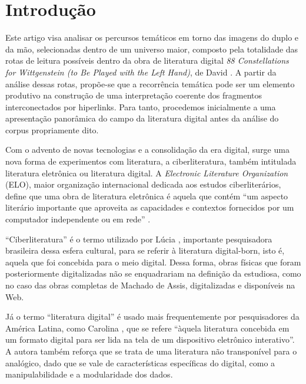 \documentclass[portuguese]{textolivre}
\begin{document}
\begin{polyabstract}
\begin{english}
\begin{abstract}
\end{abstract}
\end{english}
\end{polyabstract}

\section{Introdução}\label{sec-intro}
Este artigo visa analisar os percursos temáticos em torno das imagens do duplo e da mão, selecionadas dentro de um universo maior, composto pela totalidade das rotas de leitura possíveis dentro da obra de literatura digital \emph{88 Constellations for Wittgenstein (to Be Played with the Left Hand)}, de David \textcite{clark2010}. A partir da análise dessas rotas, propõe-se que a recorrência temática pode ser um elemento produtivo na construção de uma interpretação coerente dos fragmentos interconectados por hiperlinks. Para tanto, procedemos inicialmente a uma apresentação panorâmica do campo da literatura digital antes da análise do corpus propriamente dito. 

Com o advento de novas tecnologias e a consolidação da era digital, surge uma nova forma de experimentos com literatura, a ciberliteratura, também intitulada literatura eletrônica ou literatura digital. A \emph{Electronic Literature Organization} (ELO), maior organização internacional dedicada aos estudos ciberliterários, define que uma obra de literatura eletrônica é aquela que contém “um aspecto literário importante que aproveita as capacidades e contextos fornecidos por um computador independente ou em rede” \cite[p. 21]{hayles2009}.

“Ciberliteratura” é o termo utilizado por Lúcia \textcite{santaella2012}, importante pesquisadora brasileira dessa esfera cultural, para se referir à literatura digital-born, isto é, aquela que foi concebida para o meio digital. Dessa forma, obras físicas que foram posteriormente digitalizadas não se enquadrariam na definição da estudiosa, como no caso das obras completas de Machado de Assis, digitalizadas e disponíveis na Web.

Já o termo “literatura digital” é usado mais frequentemente por pesquisadores da América Latina, como Carolina \textcite[p. 4]{gainza2013}, que se refere “àquela literatura concebida em um formato digital para ser lida na tela de um dispositivo eletrônico interativo”. A autora também reforça que se trata de uma literatura não transponível para o analógico, dado que se vale de características específicas do digital, como a manipulabilidade e a modularidade dos dados.
\end{document}
